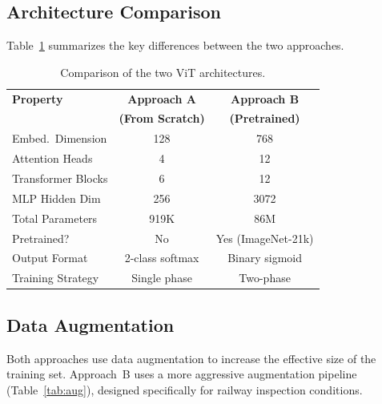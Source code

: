 \documentclass[10pt,twocolumn,letterpaper]{article}
\begin{document}
\subsection{Architecture Comparison}

Table~\ref{tab:arch} summarizes the key differences between the two approaches.

\begin{table}[h]
\centering
\caption{Comparison of the two ViT architectures.}
\label{tab:arch}
\small
\begin{tabular}{lcc}
\toprule
\textbf{Property} & \textbf{Approach A} & \textbf{Approach B} \\
& \textbf{(From Scratch)} & \textbf{(Pretrained)} \\
\midrule
Embed.\ Dimension & 128 & 768 \\
Attention Heads & 4 & 12 \\
Transformer Blocks & 6 & 12 \\
MLP Hidden Dim & 256 & 3072 \\
Total Parameters & 919K & 86M \\
Pretrained? & No & Yes (ImageNet-21k) \\
Output Format & 2-class softmax & Binary sigmoid \\
Training Strategy & Single phase & Two-phase \\
\bottomrule
\end{tabular}
\end{table}


\subsection{Data Augmentation}

Both approaches use data augmentation to increase the effective size of the training set. Approach~B uses a more aggressive augmentation pipeline (Table~\ref{tab:aug}), designed specifically for railway inspection conditions.
\end{document}
